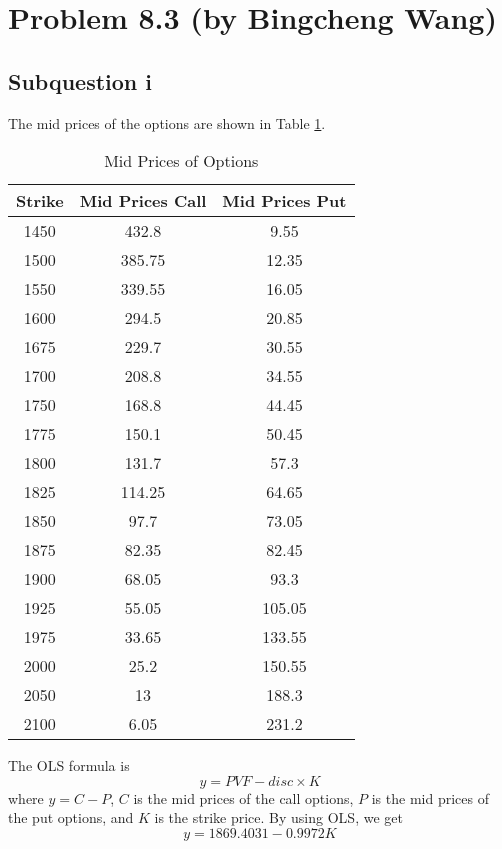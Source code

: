 \documentclass{article}
\DeclareMathOperator{\1}{\mathit{1}}
\numberwithin{figure}{section} %
\numberwithin{table}{section}
\begin{document}

\newpage
\section{Problem 8.3 (by Bingcheng Wang)}
\subsection{Subquestion i}

The mid prices of the options are shown in Table \ref{tab:midPrice}.

	\begin{table}[hbtp]
	\centering
    \caption{\label{tab:midPrice}%
    Mid Prices of Options}
    \small
    \begin{tabular}{ccc}
    \hline\hline
    \bf{Strike} & \bf{Mid Prices Call} & \bf{Mid Prices Put}\\ 
    \hline
1450 & 432.8 & 9.55\\
1500 & 385.75 & 12.35\\
1550 & 339.55 & 16.05\\
1600 & 294.5 & 20.85\\
1675 & 229.7 & 30.55\\
1700 & 208.8 & 34.55\\
1750 & 168.8 & 44.45\\
1775 & 150.1 & 50.45\\
1800 & 131.7 & 57.3\\
1825 & 114.25 & 64.65\\
1850 & 97.7 & 73.05\\
1875 & 82.35 & 82.45\\
1900 & 68.05 & 93.3\\
1925 & 55.05 & 105.05\\
1975 & 33.65 & 133.55\\
2000 & 25.2 & 150.55\\
2050 & 13 & 188.3\\
2100 & 6.05 & 231.2\\
    \hline\hline
    \end{tabular}
    \end{table}
    
The OLS formula is
	\begin{equation*}
	y = PVF - disc \times K
	\end{equation*}
where $y = C - P$, $C$ is the mid prices of the call options, $P$ is the mid prices of the put options, and $K$ is the strike price. By using OLS, we get
	\begin{equation*}
	y = 1869.4031 - 0.9972K
	\end{equation*}
	
\end{document}
